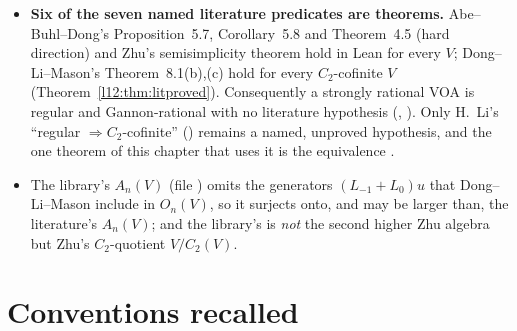 \begin{itemize}
  $V$ that satisfies the library's rationality predicate , in particular for the strongly rational
  lattice VOAs $V_{\sqrt{2m}\Z}$ (Chapter~\ref{ch:L22}). For $C_2$-cofinite $V$, Dong--Li--Mason
  rationality implies  (, Theorem~\ref{l12:thm:dlmrat});
  what remains open is only the converse (Section~\ref{l12:warn:admcr}). \emph{Correction:} the first release
  revision of this chapter said that the implication was unproved and that $V_{\sqrt{2m}\Z}$ was not covered; both claims were
  wrong.
\item \textbf{Six of the seven named literature predicates are theorems.} Abe--Buhl--Dong's Proposition~5.7, Corollary~5.8
  and Theorem~4.5 (hard direction) and Zhu's semisimplicity theorem hold in Lean for every $V$; Dong--Li--Mason's
  Theorem~8.1(b),(c) hold for every $C_2$-cofinite $V$ (Theorem~\ref{l12:thm:litproved}). Consequently a strongly rational
  VOA is regular and Gannon-rational with no literature hypothesis (,
  ). Only H.~Li's ``regular $\Rightarrow C_2$-cofinite'' ()
  remains a named, unproved hypothesis, and the one theorem of this chapter that uses it is the equivalence
  .
\item The library's $A_n(V)$ (file ) omits the generators
  $(L_{-1}+L_0)u$ that Dong--Li--Mason include in $O_n(V)$, so it surjects onto, and may be larger
  than, the literature's $A_n(V)$; and the library's  is \emph{not} the second higher Zhu
  algebra but Zhu's $C_2$-quotient $V/C_2(V)$.
\end{itemize}

\section{Conventions recalled}\label{l12:sec:recall}

